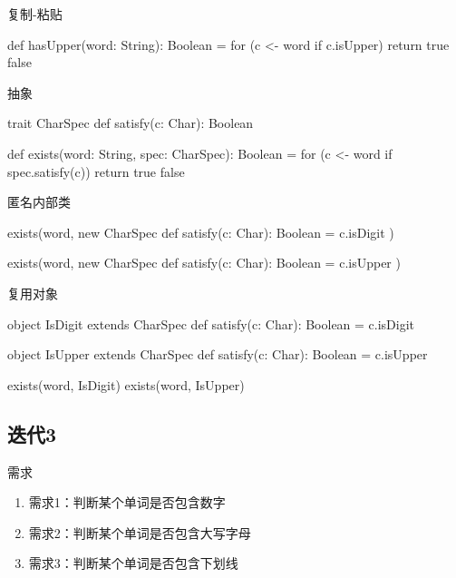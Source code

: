 \begin{frame}[fragile]{复制-粘贴}
  \begin{scala}
def hasUpper(word: String): Boolean = {
  for (c <- word if c.isUpper)
    return true
  false
}
  \end{scala}
\end{frame}

\begin{frame}[fragile]{抽象}
  \begin{scala}
trait CharSpec {
  def satisfy(c: Char): Boolean
}

def exists(word: String, spec: CharSpec): Boolean = {
  for (c <- word if spec.satisfy(c))
    return true
  false
}
  \end{scala}
\end{frame}

\begin{frame}[fragile]{匿名内部类}
  \begin{scala}
exists(word, new CharSpec {
  def satisfy(c: Char): Boolean = c.isDigit
})

exists(word, new CharSpec {
  def satisfy(c: Char): Boolean = c.isUpper
})
  \end{scala}
\end{frame}

\begin{frame}[fragile]{复用对象}
  \begin{scala}
object IsDigit extends CharSpec {
  def satisfy(c: Char): Boolean = c.isDigit
}

object IsUpper extends CharSpec {
  def satisfy(c: Char): Boolean = c.isUpper
}

exists(word, IsDigit)
exists(word, IsUpper)
  \end{scala}
\end{frame}

\subsection{迭代3}

\begin{frame}{需求}
  \begin{block}{}
    \begin{enumerate}
    \item \alert{需求1}：判断某个单词是否包含数字
    \item \alert{需求2}：判断某个单词是否包含大写字母
    \item<alert@1-> 需求3：判断某个单词是否包含下划线 
    \end{enumerate}
  \end{block}
\end{frame}

